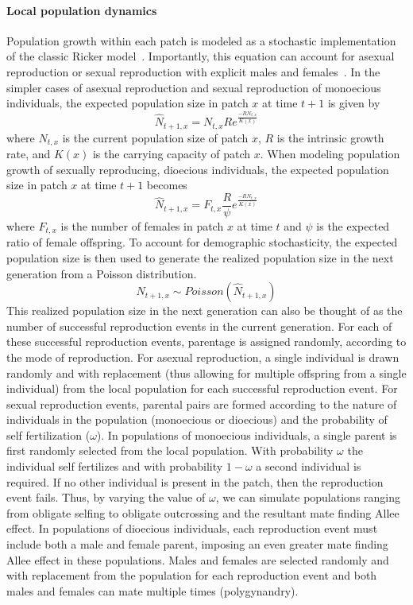 \documentclass[11pt]{article}
\begin{document}
\paragraph{Local population dynamics}
Population growth within each patch is modeled as a stochastic implementation of the classic Ricker model~\citep{ricker1954stock, melbourne2008extinction}. Importantly, this equation can account for asexual reproduction or sexual reproduction with explicit males and females~\citep{melbourne2008extinction}. In the simpler cases of asexual reproduction and sexual reproduction of monoecious individuals, the expected population size in patch $x$ at time $t+1$ is given by
\begin{equation}
\hat{N}_{t+1,x}=N_{t,x}Re^{\frac{-RN_{t,x}}{K(x)}}
\end{equation}
where $N_{t,x}$ is the current population size of patch $x$, $R$ is the intrinsic growth rate, and $K(x)$ is the carrying capacity of patch $x$. When modeling population growth of sexually reproducing, dioecious individuals, the expected population size in patch $x$ at time $t+1$ becomes
\begin{equation}
\hat{N}_{t+1,x}=F_{t,x}\frac{R}{\psi}e^{\frac{-RN_{t,x}}{K(x)}}
\end{equation}
where $F_{t,x}$ is the number of females in patch $x$ at time $t$ and $\psi$ is the expected ratio of female offspring. To account for demographic stochasticity, the expected population size is then used to generate the realized population size in the next generation from a Poisson distribution.
\begin{equation}
N_{t+1,x}\sim Poisson(\hat{N}_{t+1,x})
\end{equation}
This realized population size in the next generation can also be thought of as the number of successful reproduction events in the current generation. For each of these successful reproduction events, parentage is assigned randomly, according to the mode of reproduction. For asexual reproduction, a single individual is drawn randomly and with replacement (thus allowing for multiple offspring from a single individual) from the local population for each successful reproduction event. For sexual reproduction events, parental pairs are formed according to the nature of individuals in the population (monoecious or dioecious) and the probability of self fertilization ($\omega$). In populations of monoecious individuals, a single parent is first randomly selected from the local population. With probability $\omega$ the individual self fertilizes and with probability $1-\omega$ a second individual is required. If no other individual is present in the patch, then the reproduction event fails. Thus, by varying the value of $\omega$, we can simulate populations ranging from obligate selfing to obligate outcrossing and the resultant mate finding Allee effect. In populations of dioecious individuals, each reproduction event must include both a male and female parent, imposing an even greater mate finding Allee effect in these populations. Males and females are selected randomly and with replacement from the population for each reproduction event and both males and females can mate multiple times (polygynandry). 
\end{document}
